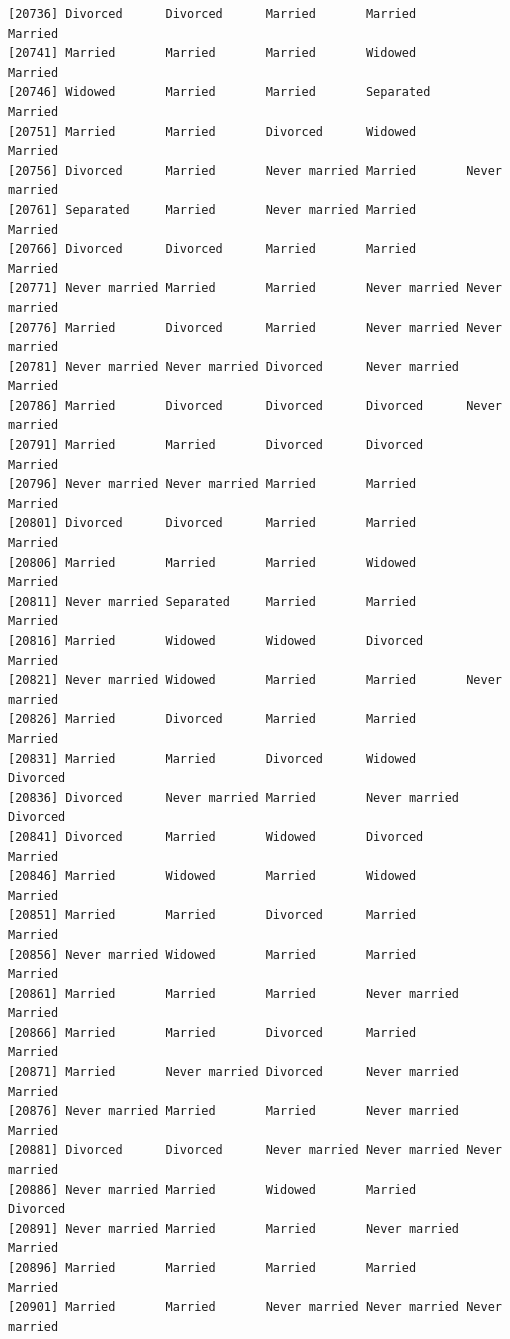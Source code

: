 \documentclass[
  letterpaper,
  DIV=11,
  numbers=noendperiod,
  oneside]{scrartcl}
\begin{document}
\begin{verbatim}
[20736] Divorced      Divorced      Married       Married       Married      
[20741] Married       Married       Married       Widowed       Married      
[20746] Widowed       Married       Married       Separated     Married      
[20751] Married       Married       Divorced      Widowed       Married      
[20756] Divorced      Married       Never married Married       Never married
[20761] Separated     Married       Never married Married       Married      
[20766] Divorced      Divorced      Married       Married       Married      
[20771] Never married Married       Married       Never married Never married
[20776] Married       Divorced      Married       Never married Never married
[20781] Never married Never married Divorced      Never married Married      
[20786] Married       Divorced      Divorced      Divorced      Never married
[20791] Married       Married       Divorced      Divorced      Married      
[20796] Never married Never married Married       Married       Married      
[20801] Divorced      Divorced      Married       Married       Married      
[20806] Married       Married       Married       Widowed       Married      
[20811] Never married Separated     Married       Married       Married      
[20816] Married       Widowed       Widowed       Divorced      Married      
[20821] Never married Widowed       Married       Married       Never married
[20826] Married       Divorced      Married       Married       Married      
[20831] Married       Married       Divorced      Widowed       Divorced     
[20836] Divorced      Never married Married       Never married Divorced     
[20841] Divorced      Married       Widowed       Divorced      Married      
[20846] Married       Widowed       Married       Widowed       Married      
[20851] Married       Married       Divorced      Married       Married      
[20856] Never married Widowed       Married       Married       Married      
[20861] Married       Married       Married       Never married Married      
[20866] Married       Married       Divorced      Married       Married      
[20871] Married       Never married Divorced      Never married Married      
[20876] Never married Married       Married       Never married Married      
[20881] Divorced      Divorced      Never married Never married Never married
[20886] Never married Married       Widowed       Married       Divorced     
[20891] Never married Married       Married       Never married Married      
[20896] Married       Married       Married       Married       Married      
[20901] Married       Married       Never married Never married Never married

\end{verbatim}
\end{document}
